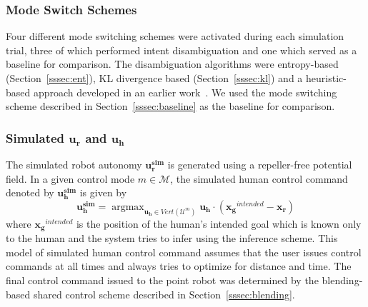 \documentclass[conference]{IEEEtran}
\DeclareMathOperator*{\argmax}{argmax}
\begin{document}
\subsubsection{Mode Switch Schemes}
Four different mode switching schemes were activated during each simulation trial, three of which performed intent disambiguation and one which served as a baseline for comparison. The disambiguation algorithms were entropy-based (Section~\ref{sssec:ent}), KL divergence based (Section~\ref{sssec:kl}) and a heuristic-based approach developed in an earlier work~\citep{gopinath2017mode}. We used the mode switching scheme described in Section~\ref{sssec:baseline} as the baseline for comparison. 
\subsubsection{Simulated $\boldsymbol{u_r}$ and $\boldsymbol{u_h}$}
The simulated robot autonomy $\boldsymbol{u^{sim}_r}$ is generated using a repeller-free potential field. In a given control mode $m \in \mathcal{M}$, the simulated human control command denoted by $\boldsymbol{u^{sim}_h}$ is given by
\begin{equation*}
\boldsymbol{u^{sim}_h} = \argmax_{\boldsymbol{u_h} \in Vert(\mathcal{U}^m)} \boldsymbol{u_h}\cdot(\boldsymbol{x_g}^{intended} - \boldsymbol{x_r})
\end{equation*}
where $\boldsymbol{x_g}^{intended}$ is the position of the human's intended goal which is known only to the human and the system tries to infer using the inference scheme. This model of simulated human control command assumes that the user issues control commands at all times and always tries to optimize for distance and time. The final control command issued to the point robot was determined by the blending-based shared control scheme described in Section~\ref{sssec:blending}.
\end{document}
